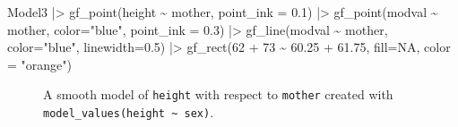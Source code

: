 \documentclass[
  letterpaper,
  DIV=11,
  numbers=noendperiod,
  oneside]{scrartcl}
\newenvironment{Shaded}{\begin{snugshade}}{\end{snugshade}}
\newcommand{\AttributeTok}[1]{\textcolor[rgb]{0.40,0.45,0.13}{#1}}
\newcommand{\ConstantTok}[1]{\textcolor[rgb]{0.56,0.35,0.01}{#1}}
\newcommand{\DecValTok}[1]{\textcolor[rgb]{0.68,0.00,0.00}{#1}}
\newcommand{\FloatTok}[1]{\textcolor[rgb]{0.68,0.00,0.00}{#1}}
\newcommand{\FunctionTok}[1]{\textcolor[rgb]{0.28,0.35,0.67}{#1}}
\newcommand{\NormalTok}[1]{\textcolor[rgb]{0.00,0.23,0.31}{#1}}
\newcommand{\SpecialCharTok}[1]{\textcolor[rgb]{0.37,0.37,0.37}{#1}}
\newcommand{\StringTok}[1]{\textcolor[rgb]{0.13,0.47,0.30}{#1}}
\begin{document}
\begin{Shaded}
\begin{Highlighting}[]
\NormalTok{Model3 }\SpecialCharTok{|\textgreater{}} 
  \FunctionTok{gf\_point}\NormalTok{(height }\SpecialCharTok{\textasciitilde{}}\NormalTok{ mother, }\AttributeTok{point\_ink =} \FloatTok{0.1}\NormalTok{) }\SpecialCharTok{|\textgreater{}} 
  \FunctionTok{gf\_point}\NormalTok{(modval }\SpecialCharTok{\textasciitilde{}}\NormalTok{ mother, }\AttributeTok{color=}\StringTok{"blue"}\NormalTok{, }\AttributeTok{point\_ink =} \FloatTok{0.3}\NormalTok{) }\SpecialCharTok{|\textgreater{}}
  \FunctionTok{gf\_line}\NormalTok{(modval }\SpecialCharTok{\textasciitilde{}}\NormalTok{ mother, }\AttributeTok{color=}\StringTok{"blue"}\NormalTok{, }\AttributeTok{linewidth=}\FloatTok{0.5}\NormalTok{) }\SpecialCharTok{|\textgreater{}}
  \FunctionTok{gf\_rect}\NormalTok{(}\DecValTok{62} \SpecialCharTok{+} \DecValTok{73} \SpecialCharTok{\textasciitilde{}} \FloatTok{60.25} \SpecialCharTok{+} \FloatTok{61.75}\NormalTok{, }\AttributeTok{fill=}\ConstantTok{NA}\NormalTok{, }\AttributeTok{color =} \StringTok{"orange"}\NormalTok{)}
\end{Highlighting}
\end{Shaded}

\begin{figure}[H]


\caption{\label{fig-model3}A smooth model of \texttt{height} with
respect to \texttt{mother} created with
\texttt{model\_values(height\ \textasciitilde{}\ sex)}.}

\end{figure}%
\end{document}
